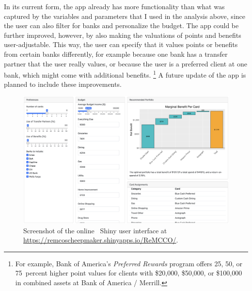 In its current form, the app already has more functionality than what was captured by the variables and parameters that I used in the analysis above, since the user can also filter for banks and personalize the budget. 
The app could be further improved, however, by also making the valuations of points and benefits user-adjustable. 
This way, the user can specify that it values points or benefits from certain banks differently, for example because one bank has a transfer partner that the user really values, or because the user is a preferred client at one bank, which might come with additional benefits.%
\footnote{For example, Bank of America's \emph{Preferred Rewards} program offers 25, 50, or 75~percent higher point values for clients with \$20,000, \$50,000, or \$100,000 in combined assets at Bank of America / Merrill.} 
A future update of the app is planned to include these improvements. 

\begin{landscape}
\begin{figure}[t!h]
    \begin{center}
    \includegraphics[scale=0.45]{../Misc/REMCCO.png}
    \caption{Screenshot of the online \sR\ \textsf{Shiny} user interface at \url{https://remcoscheepmaker.shinyapps.io/ReMCCO/}.}
    \label{fig:REMCCO}
    \end{center}
\end{figure}
\end{landscape}

